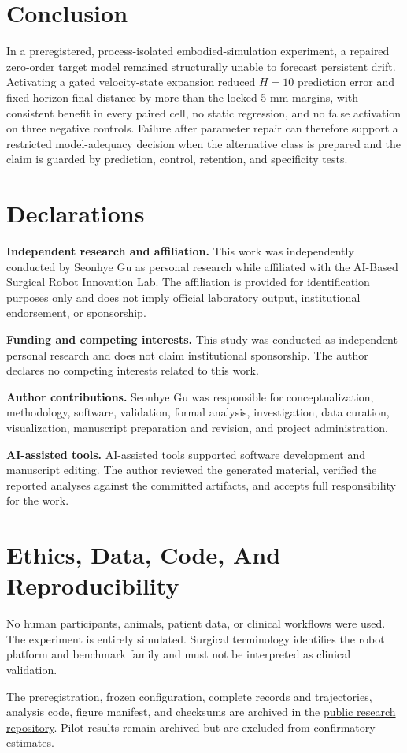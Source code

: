 \documentclass[10pt]{article}
\begin{document}
\section{Conclusion}

In a preregistered, process-isolated embodied-simulation experiment, a repaired zero-order target model remained structurally unable to forecast persistent drift. Activating a gated velocity-state expansion reduced \(H=10\) prediction error and fixed-horizon final distance by more than the locked 5 mm margins, with consistent benefit in every paired cell, no static regression, and no false activation on three negative controls. Failure after parameter repair can therefore support a restricted model-adequacy decision when the alternative class is prepared and the claim is guarded by prediction, control, retention, and specificity tests.

\section*{Declarations}

\textbf{Independent research and affiliation.} This work was independently conducted by Seonhye Gu as personal research while affiliated with the AI-Based Surgical Robot Innovation Lab. The affiliation is provided for identification purposes only and does not imply official laboratory output, institutional endorsement, or sponsorship.

\textbf{Funding and competing interests.} This study was conducted as independent personal research and does not claim institutional sponsorship. The author declares no competing interests related to this work.

\textbf{Author contributions.} Seonhye Gu was responsible for conceptualization, methodology, software, validation, formal analysis, investigation, data curation, visualization, manuscript preparation and revision, and project administration.

\textbf{AI-assisted tools.} AI-assisted tools supported software development and manuscript editing. The author reviewed the generated material, verified the reported analyses against the committed artifacts, and accepts full responsibility for the work.

\section*{Ethics, Data, Code, And Reproducibility}

No human participants, animals, patient data, or clinical workflows were used. The experiment is entirely simulated. Surgical terminology identifies the robot platform and benchmark family and must not be interpreted as clinical validation.

The preregistration, frozen configuration, complete records and trajectories, analysis code, figure manifest, and checksums are archived in the \href{\detokenize{https://github.com/higuseonhye/research-os}}{public research repository}. Pilot results remain archived but are excluded from confirmatory estimates.




\end{document}
